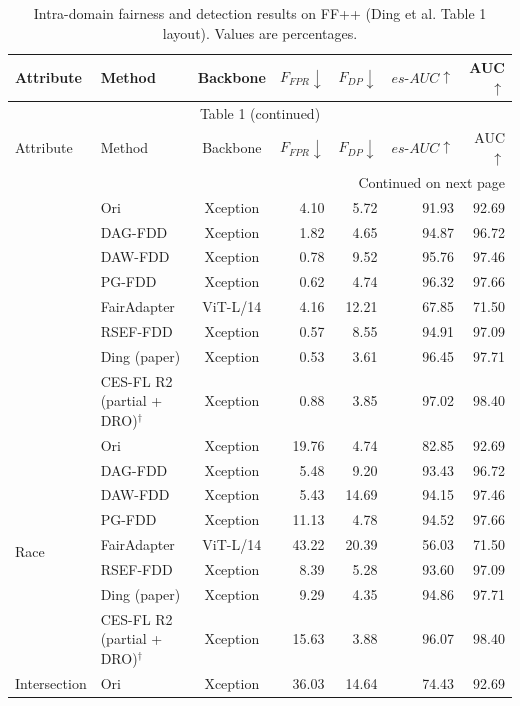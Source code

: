 \documentclass[9pt]{article}
\begin{document}
\begin{landscape}\scriptsize\begin{longtable}{llcrrrr}
\caption{Intra-domain fairness and detection results on FF++ (Ding et al. Table 1 layout). Values are percentages.}\label{tab:table1}\\
\toprule Attribute & Method & Backbone & $F_{FPR}\downarrow$ & $F_{DP}\downarrow$ & $es\text{-}AUC\uparrow$ & AUC$\uparrow$\\\midrule\endfirsthead
\multicolumn{7}{c}{Table 1 (continued)}\\\toprule Attribute & Method & Backbone & $F_{FPR}\downarrow$ & $F_{DP}\downarrow$ & $es\text{-}AUC\uparrow$ & AUC$\uparrow$\\\midrule\endhead
\midrule\multicolumn{7}{r}{Continued on next page}\\\endfoot\bottomrule\endlastfoot
\multirow{8}{*}{Gender} & Ori & Xception & 4.10 & 5.72 & 91.93 & 92.69\\
 & DAG-FDD & Xception & 1.82 & 4.65 & 94.87 & 96.72\\
 & DAW-FDD & Xception & 0.78 & 9.52 & 95.76 & 97.46\\
 & PG-FDD & Xception & 0.62 & 4.74 & 96.32 & 97.66\\
 & FairAdapter & ViT-L/14 & 4.16 & 12.21 & 67.85 & 71.50\\
 & RSEF-FDD & Xception & 0.57 & 8.55 & 94.91 & 97.09\\
 & Ding (paper) & Xception & 0.53 & 3.61 & 96.45 & 97.71\\
\rowcolor{blue!8} & CES-FL R2 (partial + DRO)$^{\dagger}$ & Xception & 0.88 & 3.85 & 97.02 & 98.40\\
\midrule
\multirow{8}{*}{Race} & Ori & Xception & 19.76 & 4.74 & 82.85 & 92.69\\
 & DAG-FDD & Xception & 5.48 & 9.20 & 93.43 & 96.72\\
 & DAW-FDD & Xception & 5.43 & 14.69 & 94.15 & 97.46\\
 & PG-FDD & Xception & 11.13 & 4.78 & 94.52 & 97.66\\
 & FairAdapter & ViT-L/14 & 43.22 & 20.39 & 56.03 & 71.50\\
 & RSEF-FDD & Xception & 8.39 & 5.28 & 93.60 & 97.09\\
 & Ding (paper) & Xception & 9.29 & 4.35 & 94.86 & 97.71\\
\rowcolor{blue!8} & CES-FL R2 (partial + DRO)$^{\dagger}$ & Xception & 15.63 & 3.88 & 96.07 & 98.40\\
\midrule
\multirow{8}{*}{Intersection} & Ori & Xception & 36.03 & 14.64 & 74.43 & 92.69\\

\end{longtable}
\end{landscape}
\end{document}
